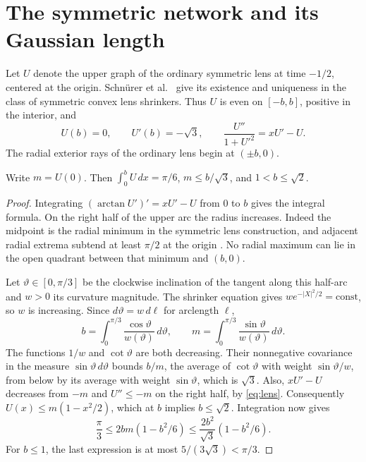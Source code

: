 \section{The symmetric network and its Gaussian length}
\label{sec:flow}

Let \(U\) denote the upper graph of the ordinary symmetric lens at time
\(-1/2\), centered at the origin. Schn\"urer et al.~\cite[Theorem~1.2 and
Proposition~5.1]{lens} give its existence and uniqueness in the class of
symmetric convex lens shrinkers. Thus \(U\) is even on \([-b,b]\), positive
in the interior, and
\begin{equation}
 U(b)=0,\qquad U'(b)=-\sqrt3,\qquad
 \frac{U''}{1+U'^2}=xU'-U .
 \label{eq:lens}
\end{equation}
The radial exterior rays of the ordinary lens begin at \((\pm b,0)\).

\begin{lemma}\label{lem:radius}
Write \(m=U(0)\). Then \(\int_0^b U\,dx=\pi/6\),
\(m\le b/\sqrt3\), and \(1<b\le\sqrt2\).
\end{lemma}

\begin{proof}
Integrating \((\arctan U')'=xU'-U\) from \(0\) to \(b\) gives the
integral formula. On the right half of the upper arc the radius increases.
Indeed the midpoint is the radial minimum in the symmetric lens construction,
and adjacent radial extrema subtend at least \(\pi/2\) at the origin
\cite[proof of Proposition~5.5]{lens}. No radial maximum can lie in the open quadrant
between that minimum and \((b,0)\).

Let \(\vartheta\in[0,\pi/3]\) be the clockwise inclination of the tangent
along this half-arc and \(w>0\) its curvature magnitude. The shrinker
equation gives \(w e^{-|X|^2/2}=\mathrm{const}\), so \(w\) is increasing.
Since \(d\vartheta=w\,d\ell\) for arclength \(\ell\),
\[
 b=\int_0^{\pi/3}\frac{\cos\vartheta}{w(\vartheta)}\,d\vartheta,
 \qquad
 m=\int_0^{\pi/3}\frac{\sin\vartheta}{w(\vartheta)}\,d\vartheta .
\]
The functions \(1/w\) and \(\cot\vartheta\) are both decreasing. Their
nonnegative covariance in the measure \(\sin\vartheta\,d\vartheta\)
bounds \(b/m\), the average of \(\cot\vartheta\) with weight
\(\sin\vartheta/w\), from below by its average with weight
\(\sin\vartheta\), which is \(\sqrt3\). Also, \(xU'-U\) decreases from \(-m\)
and \(U''\le-m\) on the right half, by \eqref{eq:lens}. Consequently
\(U(x)\le m(1-x^2/2)\), which at \(b\) implies \(b\le\sqrt2\).
Integration now gives
\[
 \frac{\pi}{3}\le 2bm(1-b^2/6)
 \le \frac{2b^2}{\sqrt3}(1-b^2/6).
\]
For \(b\le1\), the last expression is at most \(5/(3\sqrt3)<\pi/3\).
\end{proof}

